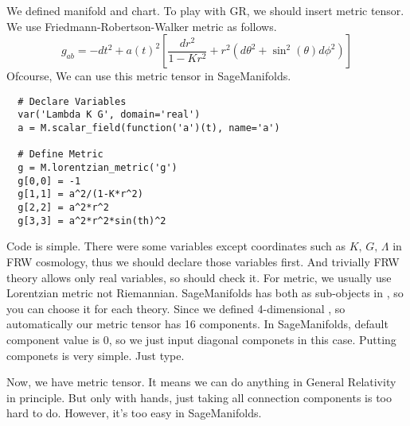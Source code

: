 \documentclass[%
 reprint,
 amsmath,amssymb,
 aps,
]{revtex4-1}
\begin{document}
We defined manifold and chart. To play with GR, we should insert metric tensor.
We use Friedmann-Robertson-Walker metric as follows.
\begin{equation}
  g_{ab} = -dt^2 + a(t)^2 \left[ \frac{dr^2}{1-Kr^2} + r^2(d\theta^2  + \sin^2(\theta)d\phi^2)\right]
\end{equation}
Ofcourse, We can use this metric tensor in SageManifolds.
\begin{lstlisting}
  # Declare Variables
  var('Lambda K G', domain='real')
  a = M.scalar_field(function('a')(t), name='a')

  # Define Metric
  g = M.lorentzian_metric('g')
  g[0,0] = -1
  g[1,1] = a^2/(1-K*r^2)
  g[2,2] = a^2*r^2
  g[3,3] = a^2*r^2*sin(th)^2
\end{lstlisting}  
Code is simple. There were some variables except coordinates such as
$K,\,G,\,\Lambda$ in FRW cosmology, thus we should declare those variables
first. And trivially FRW theory allows only real variables, so should check it.
For metric, we usually use Lorentzian metric not Riemannian. SageManifolds has
both as sub-objects in , so you can choose it for each theory.
Since we defined 4-dimensional , so automatically our metric
tensor has 16 components. In SageManifolds, default component value is 0, so we
just input diagonal componets in this case. Putting componets is very simple.
Just type.

Now, we have metric tensor. It means we can do anything in General Relativity in
principle. But only with hands, just taking all connection components is too
hard to do. However, it's too easy in SageManifolds.
\end{document}
